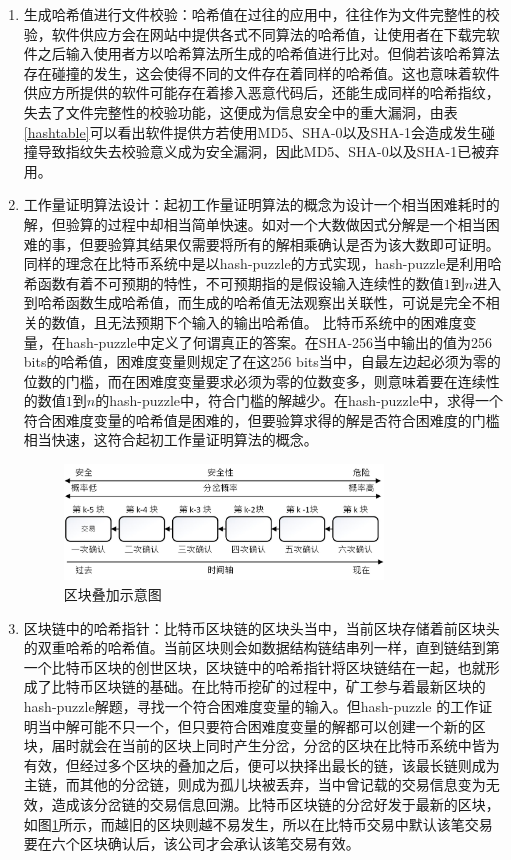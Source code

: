 				\begin{enumerate}
				\item 生成哈希值进行文件校验：哈希值在过往的应用中，往往作为文件完整性的校验，软件供应方会在网站中提供各式不同算法的哈希值，让使⽤者在下载完软件之后输⼊使⽤者方以哈希算法所⽣成的哈希值进⾏⽐对。但倘若该哈希算法存在碰撞的发生，这会使得不同的文件存在着同样的哈希值。这也意味着软件供应方所提供的软件可能存在着掺入恶意代码后，还能生成同样的哈希指纹，失去了文件完整性的校验功能，这便成为信息安全中的重大漏洞，由表\ref{hashtable}可以看出软件提供方若使用MD5、SHA-0以及SHA-1会造成发生碰撞导致指纹失去校验意义成为安全漏洞，因此MD5、SHA-0以及SHA-1已被弃用。

				\item 工作量证明算法设计：起初工作量证明算法的概念为设计一个相当困难耗时的解，但验算的过程中却相当简单快速。如对一个大数做因式分解是一个相当困难的事，但要验算其结果仅需要将所有的解相乘确认是否为该大数即可证明。同样的理念在比特币系统中是以hash-puzzle的方式实现，hash-puzzle是利用哈希函数有着不可预期的特性，不可预期指的是假设输入连续性的数值$1$到$n$进入到哈希函数生成哈希值，而生成的哈希值无法观察出关联性，可说是完全不相关的数值，且无法预期下个输入的输出哈希值。
				比特币系统中的困难度变量，在hash-puzzle中定义了何谓真正的答案。在SHA-256当中输出的值为256 bits的哈希值，困难度变量则规定了在这256 bits当中，自最左边起必须为零的位数的门槛，而在困难度变量要求必须为零的位数变多，则意味着要在连续性的数值$1$到$n$的hash-puzzle中，符合门槛的解越少。在hash-puzzle中，求得一个符合困难度变量的哈希值是困难的，但要验算求得的解是否符合困难度的门槛相当快速，这符合起初工作量证明算法的概念。

				\begin{figure}[!htbp]
					\centering
					\includegraphics[width = 0.8\textwidth]{6confirm.jpg}
					\caption{区块叠加示意图}\label{6confirm}
				\end{figure}

				\item 区块链中的哈希指针：比特币区块链的区块头当中，当前区块存储着前区块头的双重哈希的哈希值。当前区块则会如数据结构链结串列一样，直到链结到第一个比特币区块的创世区块，区块链中的哈希指针将区块链结在一起，也就形成了比特币区块链的基础。在比特币挖矿的过程中，矿工参与着最新区块的hash-puzzle解题，寻找一个符合困难度变量的输入。但hash-puzzle 的工作证明当中解可能不只一个，但只要符合困难度变量的解都可以创建一个新的区块，届时就会在当前的区块上同时产生分岔，分岔的区块在比特币系统中皆为有效，但经过多个区块的叠加之后，便可以抉择出最长的链，该最长链则成为主链，而其他的分岔链，则成为孤儿块被丢弃，当中曾记载的交易信息变为无效，造成该分岔链的交易信息回溯。比特币区块链的分岔好发于最新的区块，如图\ref{6confirm}所示，而越旧的区块则越不易发生，所以在比特币交易中默认该笔交易要在六个区块确认后，该公司才会承认该笔交易有效。

				\end{enumerate}


